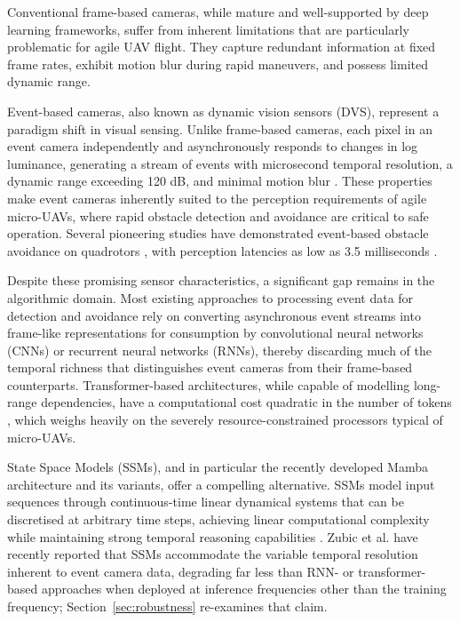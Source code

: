 \documentclass[11pt, a4paper]{report}
\begin{document}
Conventional frame-based cameras, while mature and well-supported by deep learning frameworks, suffer from inherent limitations that are particularly problematic for agile UAV flight. They capture redundant information at fixed frame rates, exhibit motion blur during rapid maneuvers, and possess limited dynamic range. 

Event-based cameras, also known as dynamic vision sensors (DVS), represent a paradigm shift in visual sensing. Unlike frame-based cameras, each pixel in an event camera independently and asynchronously responds to changes in log luminance, generating a stream of events with microsecond temporal resolution, a dynamic range exceeding 120 dB, and minimal motion blur \cite{gallego2020event}. These properties make event cameras inherently suited to the perception requirements of agile micro-UAVs, where rapid obstacle detection and avoidance are critical to safe operation. Several pioneering studies have demonstrated event-based obstacle avoidance on quadrotors \cite{falanga2020dynamic, sanket2020evdodgenet}, with perception latencies as low as 3.5 milliseconds \cite{falanga2020dynamic}. 

Despite these promising sensor characteristics, a significant gap remains in the algorithmic domain. Most existing approaches to processing event data for detection and avoidance rely on converting asynchronous event streams into frame-like representations for consumption by convolutional neural networks (CNNs) or recurrent neural networks (RNNs), thereby discarding much of the temporal richness that distinguishes event cameras from their frame-based counterparts. Transformer-based architectures, while capable of modelling long-range dependencies, have a computational cost quadratic in the number of tokens \cite{vaswani2017attention}, which weighs heavily on the severely resource-constrained processors typical of micro-UAVs. 

State Space Models (SSMs), and in particular the recently developed Mamba architecture and its variants, offer a compelling alternative. SSMs model input sequences through continuous-time linear dynamical systems that can be discretised at arbitrary time steps, achieving linear computational complexity while maintaining strong temporal reasoning capabilities \cite{gu2022efficiently}. Zubic et al. \cite{zubic2024state} have recently reported that SSMs accommodate the variable temporal resolution inherent to event camera data, degrading far less than RNN- or transformer-based approaches when deployed at inference frequencies other than the training frequency; Section~\ref{sec:robustness} re-examines that claim. 
\end{document}
